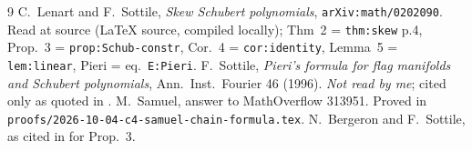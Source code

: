 \documentclass[11pt]{article}
\theoremstyle{plain}
\theoremstyle{definition}
\begin{document}
\begin{thebibliography}{9}
 C.~Lenart and F.~Sottile, \emph{Skew Schubert polynomials},
  \texttt{arXiv:math/0202090}. Read at source (\LaTeX{} source, compiled
  locally); Thm~2 = \texttt{thm:skew} p.4, Prop.~3 = \texttt{prop:Schub-constr},
  Cor.~4 = \texttt{cor:identity}, Lemma~5 = \texttt{lem:linear},
  Pieri = eq.~\texttt{E:Pieri}.
 F.~Sottile, \emph{Pieri's formula for flag manifolds and
  Schubert polynomials}, Ann.\ Inst.\ Fourier 46 (1996). \emph{Not read by me};
  cited only as quoted in \cite{LS02}.
 M.~Samuel, answer to MathOverflow 313951. Proved in
  \texttt{proofs/2026-10-04-c4-samuel-chain-formula.tex}.
 N.~Bergeron and F.~Sottile, as cited in \cite{LS02} for Prop.~3.
\end{thebibliography}
\end{document}
